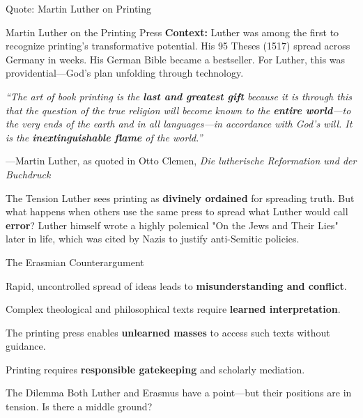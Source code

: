 \documentclass[aspectratio=169]{beamer}
\begin{document}
\begin{frame}{Quote: Martin Luther on Printing}
\begin{exampleblock}{\faQuoteLeft\hspace{0.5em}Martin Luther on the Printing Press}
\small
\textbf{Context:} Luther was among the first to recognize printing's transformative potential. His 95 Theses (1517) spread across Germany in weeks. His German Bible became a bestseller. For Luther, this was providential---God's plan unfolding through technology.

\vspace{0.5em}
\textit{``The art of book printing is the \textbf{last and greatest gift} because it is through this that the question of the true religion will become known to the \textbf{entire world}---to the very ends of the earth and in all languages---in accordance with God's will. It is the \textbf{inextinguishable flame} of the world.''}

\vspace{0.3em}
\hfill---Martin Luther, as quoted in Otto Clemen, \textit{Die lutherische Reformation und der Buchdruck}
\end{exampleblock}

\vspace{0.3em}
\begin{block}{\faLightbulb\hspace{0.5em}The Tension}
Luther sees printing as \textbf{divinely ordained} for spreading truth. But what happens when others use the same press to spread what Luther would call \textbf{error}? Luther himself wrote a highly polemical "On the Jews and Their Lies" later in life, which was cited by Nazis to justify anti-Semitic policies.
\end{block}
\end{frame}

\begin{frame}{The Erasmian Counterargument}
\begin{argument}
  \item Rapid, uncontrolled spread of ideas leads to \textbf{misunderstanding and conflict}.
  \item Complex theological and philosophical texts require \textbf{learned interpretation}.
  \item The printing press enables \textbf{unlearned masses} to access such texts without guidance.
  \item[\textbf{$\therefore$}] Printing requires \textbf{responsible gatekeeping} and scholarly mediation.
\end{argument}

\vspace{0.5em}

\vspace{0.3em}
\begin{alertblock}{The Dilemma}
Both Luther and Erasmus have a point---but their positions are in tension. Is there a middle ground?
\end{alertblock}
\end{frame}
\end{document}
